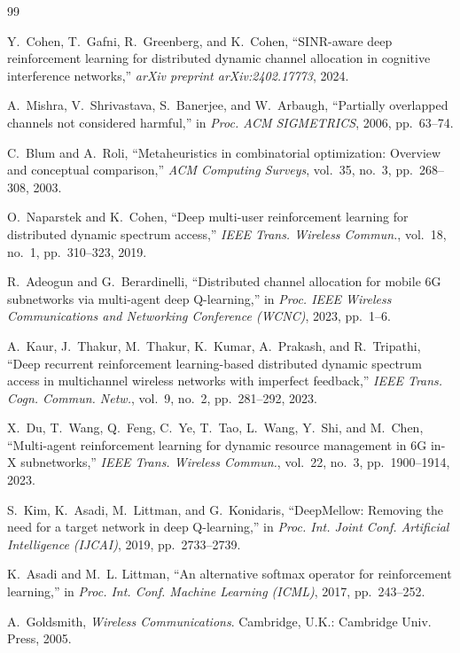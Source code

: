 \documentclass[journal]{IEEEtran}
\begin{document}
\begin{thebibliography}{99}

Y.~Cohen, T.~Gafni, R.~Greenberg, and K.~Cohen,
``SINR-aware deep reinforcement learning for distributed dynamic channel
allocation in cognitive interference networks,''
\emph{arXiv preprint arXiv:2402.17773}, 2024.

A.~Mishra, V.~Shrivastava, S.~Banerjee, and W.~Arbaugh,
``Partially overlapped channels not considered harmful,''
in \emph{Proc. ACM SIGMETRICS}, 2006, pp.~63--74.

C.~Blum and A.~Roli,
``Metaheuristics in combinatorial optimization: Overview and conceptual
comparison,'' \emph{ACM Computing Surveys}, vol.~35, no.~3, pp.~268--308, 2003.

O.~Naparstek and K.~Cohen,
``Deep multi-user reinforcement learning for distributed dynamic spectrum
access,'' \emph{IEEE Trans. Wireless Commun.}, vol.~18, no.~1, pp.~310--323,
2019.

R.~Adeogun and G.~Berardinelli,
``Distributed channel allocation for mobile 6G subnetworks via multi-agent deep
Q-learning,'' in \emph{Proc. IEEE Wireless Communications and Networking
Conference (WCNC)}, 2023, pp.~1--6.

A.~Kaur, J.~Thakur, M.~Thakur, K.~Kumar, A.~Prakash, and R.~Tripathi,
``Deep recurrent reinforcement learning-based distributed dynamic spectrum
access in multichannel wireless networks with imperfect feedback,''
\emph{IEEE Trans. Cogn. Commun. Netw.}, vol.~9, no.~2, pp.~281--292, 2023.

X.~Du, T.~Wang, Q.~Feng, C.~Ye, T.~Tao, L.~Wang, Y.~Shi, and M.~Chen,
``Multi-agent reinforcement learning for dynamic resource management in 6G in-X
subnetworks,'' \emph{IEEE Trans. Wireless Commun.}, vol.~22, no.~3,
pp.~1900--1914, 2023.

S.~Kim, K.~Asadi, M.~Littman, and G.~Konidaris,
``DeepMellow: Removing the need for a target network in deep Q-learning,''
in \emph{Proc. Int. Joint Conf. Artificial Intelligence (IJCAI)}, 2019,
pp.~2733--2739.

K.~Asadi and M.~L. Littman,
``An alternative softmax operator for reinforcement learning,''
in \emph{Proc. Int. Conf. Machine Learning (ICML)}, 2017, pp.~243--252.

A.~Goldsmith,
\emph{Wireless Communications}.
Cambridge, U.K.: Cambridge Univ. Press, 2005.


\end{thebibliography}
\end{document}
